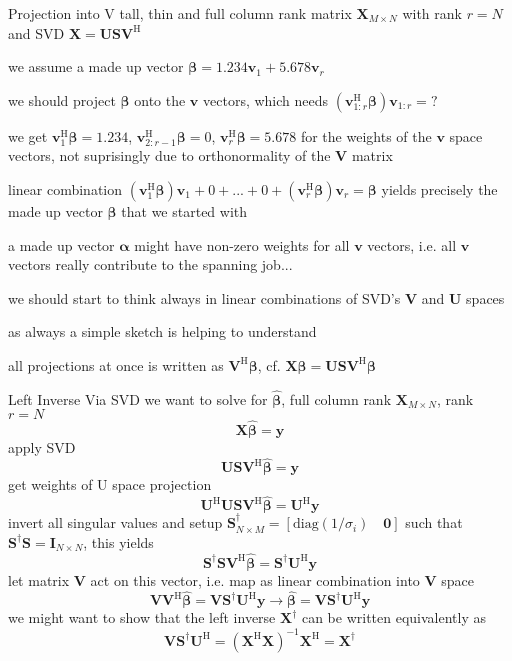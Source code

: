 \documentclass[mathserif, aspectratio=43]{intbeamer}
\begin{document}
\begin{frame}{Projection into V}
tall, thin and full column rank matrix $\bm{X}_{M \times N}$ with rank $r=N$ and SVD $\bm{X} = \bm{U} \bm{S} \bm{V}^\mathrm{H}$

we assume a made up vector $\bm{\beta} = 1.234 \bm{v}_1 + 5.678 \bm{v}_r$

we should project $\bm{\beta}$ onto the $\bm{v}$ vectors, which needs $(\bm{v}_{1:r}^\mathrm{H} \bm{\beta}) \bm{v}_{1:r} = ?$

we get $\bm{v}_{1}^\mathrm{H} \bm{\beta} = 1.234$, $\bm{v}_{2:r-1}^\mathrm{H} \bm{\beta} = 0$, $\bm{v}_{r}^\mathrm{H} \bm{\beta} = 5.678$ for the weights of the $\bm{v}$
space vectors, not suprisingly due to orthonormality of the $\bm{V}$ matrix

linear combination $(\bm{v}_{1}^\mathrm{H} \bm{\beta})\bm{v}_1 + 0 + ... + 0 + (\bm{v}_{r}^\mathrm{H} \bm{\beta})\bm{v}_r = \bm{\beta}$ yields precisely the made up vector $\bm{\beta}$ that we started with

a made up vector $\bm{\alpha}$ might have non-zero weights for all $\bm{v}$ vectors, i.e. all $\bm{v}$ vectors really contribute to the spanning job...

we should start to think always in linear combinations of SVD's $\bm{V}$ and $\bm{U}$ spaces

as always a simple sketch is helping to understand

all projections at once is written as $\bm{V}^\mathrm{H} \bm{\beta}$, cf. $\bm{X}\bm{\beta} = \bm{U} \bm{S} \bm{V}^\mathrm{H}\bm{\beta}$

\end{frame}


\begin{frame}{Left Inverse Via SVD}
we want to solve for $\hat{\bm{\beta}}$, full column rank $\bm{X}_{M \times N}$, rank $r=N$
$$\bm{X} \hat{\bm{\beta}} = \bm{y}$$
apply SVD
$$\bm{U} \bm{S} \bm{V}^\mathrm{H} \hat{\bm{\beta}} = \bm{y}$$
get weights of U space projection
$$\bm{U}^\mathrm{H} \bm{U} \bm{S} \bm{V}^\mathrm{H} \hat{\bm{\beta}} = \bm{U}^\mathrm{H}\bm{y}$$
invert all singular values and setup $\bm{S}^\dagger_{N \times M} = [\mathrm{diag}(1/\sigma_i) \quad \bm{0}]$ such that
$\bm{S}^\dagger\bm{S} = \bm{I}_{N \times N}$,
this yields
$$\bm{S}^\dagger\bm{S} \bm{V}^\mathrm{H} \hat{\bm{\beta}} = \bm{S}^\dagger\bm{U}^\mathrm{H}\bm{y}$$
let matrix $\bm{V}$ act on this vector, i.e. map as linear combination into $\bm{V}$ space
$$\bm{V} \bm{V}^\mathrm{H} \hat{\bm{\beta}} = \bm{V} \bm{S}^\dagger\bm{U}^\mathrm{H}\bm{y}
\rightarrow \hat{\bm{\beta}} = \bm{V} \bm{S}^\dagger\bm{U}^\mathrm{H}\bm{y}$$
we might want to show that the left inverse $\bm{X}^\dagger$ can be written equivalently as
$$\bm{V} \bm{S}^\dagger\bm{U}^\mathrm{H} = (\bm{X}^\mathrm{H}\bm{X})^{-1} \bm{X}^\mathrm{H} = \bm{X}^\dagger$$

\end{frame}
\end{document}
